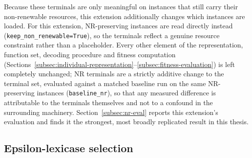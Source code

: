 Because these terminals are only meaningful on instances that still carry
their non-renewable resources, this extension additionally changes which
instances are loaded.  For
this extension, NR-preserving instances are read directly instead
(\texttt{keep\_non\_renewable=True}), so the terminals reflect a genuine
resource constraint rather than a placeholder. Every other element of the
representation, function set, decoding procedure and fitness computation
(Sections~\ref{subsec:individual-representation}--\ref{subsec:fitness-evaluation})
is left completely unchanged; NR terminals are a strictly additive change
to the terminal set, evaluated against a matched baseline run on the same
NR-preserving instances (\texttt{baseline\_nr}), so that any measured
difference is attributable to the terminals themselves and not to a
confound in the surrounding machinery. Section~\ref{subsec:nr-eval} reports
this extension's evaluation and finds it the strongest, most broadly
replicated result in this thesis.

\subsection{Epsilon-lexicase selection}
\label{subsec:lexicase-definition}

